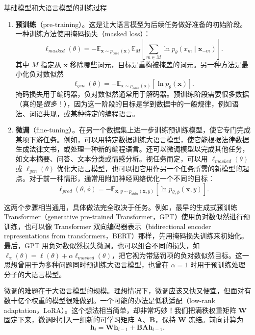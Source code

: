\begin{booknote}[colframe=blue!65!black,colback=blue!4]{基础模型和大语言模型的训练过程}
\begin{enumerate}
\item \textbf{预训练}（pre-training）。这是让大语言模型为后续任务做好准备的初始阶段。一种训练方法使用掩码损失（masked loss）：
\[
\ell_{\mathit{masked}}(\theta)
=-\mathbb{E}_{\mathbf{x}\sim p_{\mathit{data}}(\mathbf{x})}
 \mathbb{E}_{M}\left[\sum_{m\in M}\ln p_\theta(x_m\mid\mathbf{x}_{-m})\right].
\]
其中 $M$ 指定从 $\mathbf{x}$ 移除哪些词元，目标是重构被掩盖的词元。另一种方法是最小化负对数似然
\[
\ell_{\mathit{gen}}(\theta)=-\mathbb{E}_{\mathbf{x}\sim p_{\mathit{data}}(\mathbf{x})}
                         [\ln p_\theta(\mathbf{x})].
\]
掩码损失用于编码器，负对数似然通常用于解码器。预训练阶段需要很多数据（真的是\emph{很多}！），因为这一阶段的目标是学到数据中的一般规律，例如语法、词语共现，或某种特定的编程语言。
\item \textbf{微调}（fine-tuning）。在另一个数据集上进一步训练预训练模型，使它专门完成某项下游任务。例如，可以用特定数据训练大语言模型，使它能根据法律数据生成法律文书，或处理一种新的编程语言。还可以微调模型以完成其他任务，如文本摘要、问答、文本分类或情感分析。视任务而定，可以用 $\ell_{\mathit{masked}}(\theta)$ 或 $\ell_{\mathit{gen}}(\theta)$ 优化大语言模型，也可以把它用作另一个任务所需的新模型的起点。对于前一种情形，通常用附加神经网络优化一个不同的目标：
\[
\ell_{\mathit{pred}}(\theta,\phi)
=-\mathbb{E}_{\mathbf{x},y\sim p_{\mathit{data}}(\mathbf{x},y)}
       [\ln p_{\theta,\phi}(\mathbf{x},y)].
\]
\end{enumerate}
\end{booknote}

这两个步骤相当通用，具体做法完全取决于任务。例如，最早的生成式预训练 Transformer（generative pre-trained Transformer，GPT）使用负对数似然进行预训练，也可以像 Transformer 双向编码器表示（bidirectional encoder representations from transformers，BERT）那样，先用掩码损失训练来初始化。最后，GPT 用负对数似然损失微调。也可以组合不同的损失，如 $\ell_\alpha(\theta)=\ell(\theta)+\alpha\ell_{\mathit{masked}}(\theta)$，把它视为带惩罚项的负对数似然目标。这一思想曾用于为多种问题同时预训练大语言模型，也曾在 $\alpha=1$ 时用于预训练处理分子的大语言模型。

微调的难题在于大语言模型的规模。理想情况下，微调应该又快又便宜，但面对有数十亿个权重的模型很难做到。一个可能的办法是低秩适配（low-rank adaptation，LoRA）。这个想法相当简单，却非常巧妙！我们把满秩权重矩阵 $\mathbf{W}$ 固定下来，微调时引入一组新的可学习矩阵 $\mathbf{A}$、$\mathbf{B}$，保持 $\mathbf{W}$ 冻结。前向计算为
\begin{equation}
\mathbf{h}_{l}=\mathbf{W}\mathbf{h}_{l-1}+\mathbf{B}\mathbf{A}\mathbf{h}_{l-1}.
\tag{11.1}\label{eq:11-01}
\end{equation}

